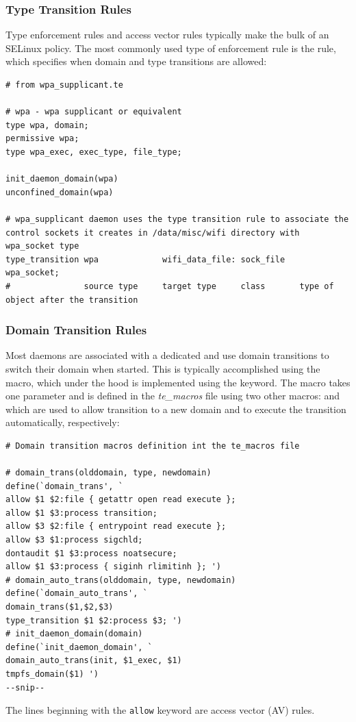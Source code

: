 \subsubsection{Type Transition Rules}

Type enforcement rules and access vector rules typically make the bulk of an SELinux policy. The most commonly used type of enforcement rule is the  rule, which specifies when domain and type transitions are allowed:
\begin{lstlisting}
# from wpa_supplicant.te

# wpa - wpa supplicant or equivalent 
type wpa, domain; 
permissive wpa;
type wpa_exec, exec_type, file_type; 

init_daemon_domain(wpa)
unconfined_domain(wpa)

# wpa_supplicant daemon uses the type transition rule to associate the control sockets it creates in /data/misc/wifi directory with wpa_socket type
type_transition wpa             wifi_data_file: sock_file   wpa_socket;
#               source type     target type     class       type of object after the transition
\end{lstlisting}

\subsubsection{Domain Transition Rules}

Most daemons are associated with a dedicated and use domain transitions to switch their domain when started. This is typically accomplished using the  macro, which under the hood is implemented using the  keyword. The  macro takes one parameter and is defined in the \textit{te\_macros} file using two other macros:  and  which are used to allow transition to a new domain and to execute the transition automatically, respectively:
\begin{lstlisting}
# Domain transition macros definition int the te_macros file

# domain_trans(olddomain, type, newdomain) 
define(`domain_trans', ` 
allow $1 $2:file { getattr open read execute }; 
allow $1 $3:process transition; 
allow $3 $2:file { entrypoint read execute }; 
allow $3 $1:process sigchld; 
dontaudit $1 $3:process noatsecure; 
allow $1 $3:process { siginh rlimitinh }; ')
# domain_auto_trans(olddomain, type, newdomain) 
define(`domain_auto_trans', ` 
domain_trans($1,$2,$3) 
type_transition $1 $2:process $3; ')
# init_daemon_domain(domain) 
define(`init_daemon_domain', ` 
domain_auto_trans(init, $1_exec, $1) 
tmpfs_domain($1) ') 
--snip--
\end{lstlisting}
The lines beginning with the \texttt{allow} keyword are access vector (AV) rules.

